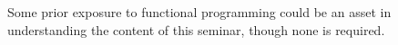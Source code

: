 Some prior exposure to functional programming could be an asset in understanding the content of this seminar, though none is required.
